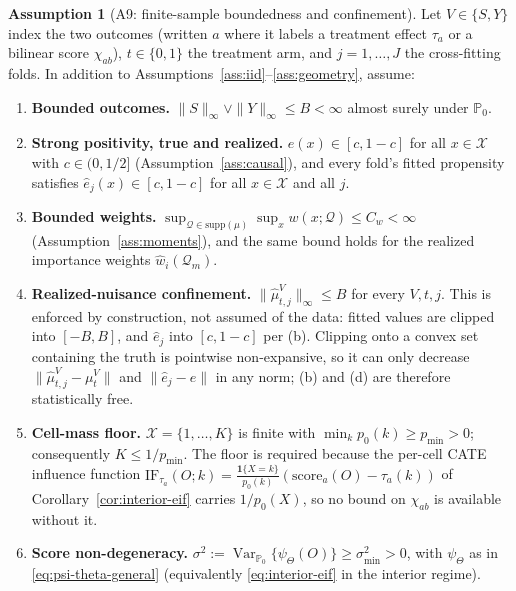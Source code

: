 \documentclass[11pt]{article}
\theoremstyle{plain}
\theoremstyle{definition}
\newtheorem{assumption}{Assumption}
\theoremstyle{remark}
\newcommand{\PP}{\mathbb{P}}
\newcommand{\cX}{\mathcal{X}}
\newcommand{\Q}{\mathcal{Q}}
\newcommand{\IF}{\mathrm{IF}}
\DeclareMathOperator{\Var}{Var}
\begin{document}
\begin{assumption}[A9: finite-sample boundedness and confinement]\label{ass:finite-n}
Let $V\in\{S,Y\}$ index the two outcomes (written $a$ where it labels a treatment effect
$\tau_a$ or a bilinear score $\chi_{ab}$), $t\in\{0,1\}$ the treatment arm, and
$j=1,\dots,J$ the cross-fitting folds. In addition to
Assumptions~\ref{ass:iid}--\ref{ass:geometry}, assume:
\begin{enumerate}[label=(\alph*)]
    \item \textbf{Bounded outcomes.} $\|S\|_\infty\vee\|Y\|_\infty\le B<\infty$ almost
    surely under $\PP_0$.
    \item \textbf{Strong positivity, true and realized.} $e(x)\in[c,1-c]$ for all
    $x\in\cX$ with $c\in(0,1/2]$ (Assumption~\ref{ass:causal}), and every fold's fitted
    propensity satisfies $\hat e_j(x)\in[c,1-c]$ for all $x\in\cX$ and all $j$.
    \item \textbf{Bounded weights.}
    $\sup_{\Q\in\mathrm{supp}(\mu)}\sup_xw(x;\Q)\le C_w<\infty$
    (Assumption~\ref{ass:moments}), and the same bound holds for the realized importance
    weights $\hat w_i(\Q_m)$.
    \item \textbf{Realized-nuisance confinement.} $\|\hat\mu^V_{t,j}\|_\infty\le B$ for
    every $V,t,j$. This is enforced by construction, not assumed of the data: fitted
    values are clipped into $[-B,B]$, and $\hat e_j$ into $[c,1-c]$ per (b). Clipping
    onto a convex set containing the truth is pointwise non-expansive, so it can only
    decrease $\|\hat\mu^V_{t,j}-\mu^V_t\|$ and $\|\hat e_j-e\|$ in any norm; (b) and (d)
    are therefore statistically free.
    \item \textbf{Cell-mass floor.} $\cX=\{1,\dots,K\}$ is finite with
    $\min_kp_0(k)\ge p_{\min}>0$; consequently $K\le1/p_{\min}$. The floor is required
    because the per-cell CATE influence function
    $\IF_{\tau_a}(O;k)=\frac{\mathbf1\{X=k\}}{p_0(k)}(\mathrm{score}_a(O)-\tau_a(k))$ of
    Corollary~\ref{cor:interior-eif} carries $1/p_0(X)$, so no bound on $\chi_{ab}$ is
    available without it.
    \item \textbf{Score non-degeneracy.}
    $\sigma^2:=\Var_{\PP_0}\{\psi_\Theta(O)\}\ge\sigma^2_{\min}>0$, with $\psi_\Theta$ as
    in \eqref{eq:psi-theta-general} (equivalently \eqref{eq:interior-eif} in the interior
    regime).
\end{enumerate}
\end{assumption}
\end{document}
